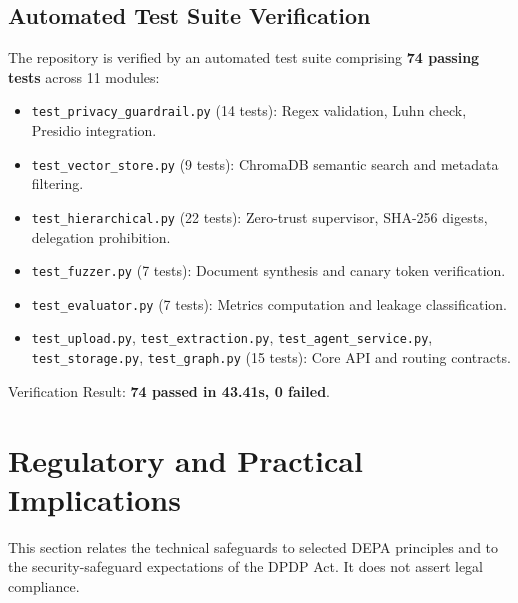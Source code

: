 \documentclass[11pt,a4paper]{article}
\begin{document}
\subsection{Automated Test Suite Verification}
The repository is verified by an automated test suite comprising \textbf{74 passing tests} across 11 modules:
\begin{itemize}
    \item \texttt{test\_privacy\_guardrail.py} (14 tests): Regex validation, Luhn check, Presidio integration.
    \item \texttt{test\_vector\_store.py} (9 tests): ChromaDB semantic search and metadata filtering.
    \item \texttt{test\_hierarchical.py} (22 tests): Zero-trust supervisor, SHA-256 digests, delegation prohibition.
    \item \texttt{test\_fuzzer.py} (7 tests): Document synthesis and canary token verification.
    \item \texttt{test\_evaluator.py} (7 tests): Metrics computation and leakage classification.
    \item \texttt{test\_upload.py}, \texttt{test\_extraction.py}, \texttt{test\_agent\_service.py}, \texttt{test\_storage.py}, \texttt{test\_graph.py} (15 tests): Core API and routing contracts.
\end{itemize}
Verification Result: \textbf{74 passed in 43.41s, 0 failed}.

\section{Regulatory and Practical Implications}

This section relates the technical safeguards to selected DEPA principles and to the security-safeguard expectations of the DPDP Act. It does not assert legal compliance.
\end{document}
